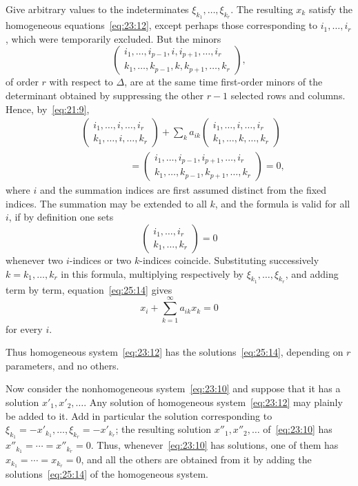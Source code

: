 \documentclass[
  paper=b5,
  fontsize=13pt,
  twoside=true,
  open=any,
  bookmarkpackage=false,
  chapterprefix=true,
  headings=normal
]{scrbook}
\theoremstyle{definition}
\begin{document}
Give arbitrary values to the indeterminates $\xi_{k_1},\ldots,\xi_{k_r}$. The resulting $x_k$ satisfy the homogeneous equations~\eqref{eq:23:12}, except perhaps those corresponding to $i_1,\ldots,i_r$, which were temporarily excluded. But the minors
\[
 \left(\begin{matrix}
 i_1,\ldots,i_{p-1},i,i_{p+1},\ldots,i_r\\
 k_1,\ldots,k_{p-1},k,k_{p+1},\ldots,k_r
 \end{matrix}\right),
\]
of order $r$ with respect to $\Delta$, are at the same time first-order minors of the determinant obtained by suppressing the other $r-1$ selected rows and columns. Hence, by~\eqref{eq:21:9},
\begin{align*}
 &\left(\begin{matrix}i_1,\ldots,i,\ldots,i_r\\
 k_1,\ldots,i,\ldots,k_r\end{matrix}\right)
 +\sum_k a_{ik}
 \left(\begin{matrix}i_1,\ldots,i,\ldots,i_r\\
 k_1,\ldots,k,\ldots,k_r\end{matrix}\right)\\
 &\hspace{5em}=
 \left(\begin{matrix}i_1,\ldots,i_{p-1},i_{p+1},\ldots,i_r\\
 k_1,\ldots,k_{p-1},k_{p+1},\ldots,k_r\end{matrix}\right)=0,
\end{align*}
where $i$ and the summation indices are first assumed distinct from the fixed indices. The summation may be extended to all $k$, and the formula is valid for all $i$, if by definition one sets
\[
 \left(\begin{matrix}i_1,\ldots,i_r\\k_1,\ldots,k_r\end{matrix}\right)=0
\]
whenever two $i$-indices or two $k$-indices coincide. Substituting successively $k=k_1,\ldots,k_r$ in this formula, multiplying respectively by $\xi_{k_1},\ldots,\xi_{k_r}$, and adding term by term, equation~\eqref{eq:25:14} gives
\[
  x_i+\sum_{k=1}^{\infty}a_{ik}x_k=0
\]
for every $i$.

Thus homogeneous system~\eqref{eq:23:12} has the solutions~\eqref{eq:25:14}, depending on $r$ parameters, and no others.

Now consider the nonhomogeneous system~\eqref{eq:23:10} and suppose that it has a solution $x'_1,x'_2,\ldots$. Any solution of homogeneous system~\eqref{eq:23:12} may plainly be added to it. Add in particular the solution corresponding to $\xi_{k_1}=-x'_{k_1},\ldots,\xi_{k_r}=-x'_{k_r}$; the resulting solution $x''_1,x''_2,\ldots$ of~\eqref{eq:23:10} has $x''_{k_1}=\cdots=x''_{k_r}=0$. Thus, whenever~\eqref{eq:23:10} has solutions, one of them has $x_{k_1}=\cdots=x_{k_r}=0$, and all the others are obtained from it by adding the solutions~\eqref{eq:25:14} of the homogeneous system.
\end{document}
